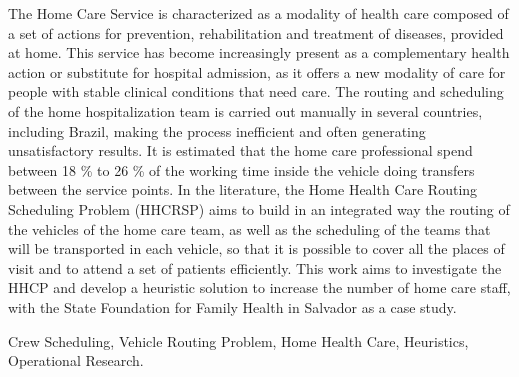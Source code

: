 \abstract
The Home Care Service is characterized as a modality of health care composed of a set of actions for prevention, rehabilitation and treatment of diseases, provided at home. This service has become increasingly present as a complementary health action or substitute for hospital admission, as it offers a new modality of care for people with stable clinical conditions that need care. The routing and scheduling of the home hospitalization team is carried out manually in several countries, including Brazil, making the process inefficient and often generating unsatisfactory results. It is estimated that the home care professional spend between 18 \% to 26 \% of the working time inside the vehicle doing transfers between the service points. In the literature, the Home Health Care Routing Scheduling Problem (HHCRSP) aims to build in an integrated way the routing of the vehicles of the home care team, as well as the scheduling of the teams that will be transported in each vehicle, so that it is possible to cover all the places of visit and to attend a set of patients efficiently. This work aims to investigate the HHCP and develop a heuristic solution to increase the number of home care staff, with the State Foundation for Family Health in Salvador as a case study.
\begin{keywords}
Crew Scheduling, Vehicle Routing Problem, Home Health Care, Heuristics, Operational Research.
\end{keywords}
